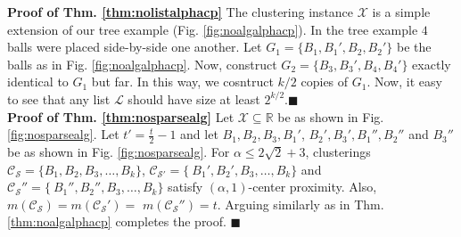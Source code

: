 \documentclass[orivec]{llncs}
\newcommand{\mc}{\mathcal}
\renewcommand{\qed}{\hfill\ensuremath{\blacksquare}}
\begin{document}
\noindent\textbf{Proof of Thm. \ref{thm:nolistalphacp}}
The clustering instance $\mc X$ is a simple extension of our tree example (Fig. \ref{fig:noalgalphacp}). In the tree example $ 4$ balls were placed side-by-side one another. Let  $G_1 = \{B_1, B_1', B_2, B_2'\}$ be the balls as in Fig. \ref{fig:noalgalphacp}. Now, construct $G_2 = \{B_3, B_3', B_4, B_4'\}$ exactly identical to $G_1$ but far. In this way, we cosntruct $k/2$ copies of $G_1$. Now, it easy to see that any list $\mc L$ should have size at least $2^{k/2}$.\qed\\


\noindent\textbf{Proof of Thm. \ref{thm:nosparsealg}}
Let $\mc X \subseteq \mathbb{R}$ be as shown in Fig. \ref{fig:nosparsealg}. Let $t' = \frac{t}{2}-1$ and let $B_1, B_2, B_3, B_1'$, $B_2', B_3', B_1'', B_2''$ and $B_3''$ be as shown in Fig. \ref{fig:nosparsealg}. For $\alpha \le 2\sqrt{2}+3$, clusterings $\mc C_{\mc S} = \{B_1, B_2, B_3, \ldots, B_k\}$, $\mc C_{\mc S'} = \{\ B_1', B_2', B_3, \ldots, B_k\}$ and $\mc C_{\mc S}'' = \{\ B_1'', B_2'', B_3, \ldots, B_k\}$ satisfy $(\alpha, 1)$-center proximity. Also, $m(\mc C_{\mc S}) = m(\mc C_{\mc S}') =$ $m(\mc C_{\mc S}'') = t$. Arguing similarly as in Thm. \ref{thm:noalgalphacp} completes the proof. \qed\\
\end{document}
